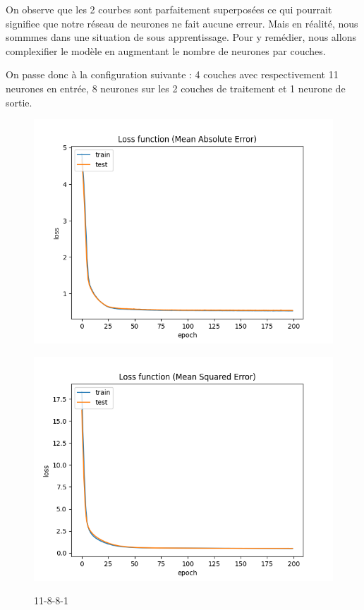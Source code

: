 \vspace{1cm}

On observe que les 2 courbes sont parfaitement superposées ce qui pourrait signifiee que notre réseau de neurones
ne fait aucune erreur. Mais en réalité, nous sommmes dans une situation de sous apprentissage. Pour y remédier, nous allons
complexifier le modèle en augmentant le nombre de neurones par couches.

On passe donc à la configuration suivante : 4 couches avec respectivement 11 neurones en entrée, 8 neurones sur les 2 couches
de traitement et 1 neurone de sortie.

\vspace{1cm}

\begin{figure}[!htb]
    \begin{minipage}{0.5\textwidth}
        \centering
        \includegraphics[width=01\textwidth]{../images/11-8-8/Loss_function(Mean_Absolute_Error).png}
        \label{fig:11-8-8-1.1}
    \end{minipage}\hfill
    \begin{minipage}{0.5\textwidth}
        \centering
        \includegraphics[width=01\textwidth]{../images/11-8-8/Loss_function(Mean_Squared_Error).png}
        \label{fig:11-8-8-1.1.2}
    \end{minipage}
    \caption{11-8-8-1}
\end{figure}

